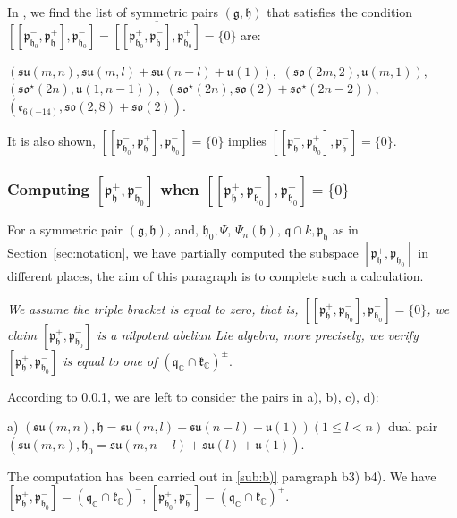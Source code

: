 \documentclass[12pt]{amsart}
\theoremstyle{definition}
\theoremstyle{remark}
\newcommand{\g}{\mathfrak{g}}
\newcommand{\h}{\mathfrak{h}}
\renewcommand{\k}{{\mathfrak k}}
\newcommand{\p}{\mathfrak p}
\newcommand{\q}{\mathfrak q}
\newcommand{\C}{{\mathbb C}}
\numberwithin{equation}{section}
\begin{document}
\subsubsection{} \label{sub:triplepairszero} In \cite[4.6]{Va},  we find the list of symmetric   pairs $(\g,\h)$ that satisfies the condition $[[ \p_{\h_0}^-,\p_\h^+ ],\p_{\h_0}^-]=\overline{[[ \p_{\h_0}^+, \p_\h^- ],
\p_{\h_0}^+]}=\{0\}$  are:
\begin{center} $ (\mathfrak{su}(m,n), \mathfrak{su} (m,l) +\mathfrak{su} ( n-l)+\mathfrak u(1)),$ $(\mathfrak{so}(2m,2), \mathfrak u(m,1)),$ \\ $(\mathfrak{so}^\star (2n), \mathfrak u(1,n-1)),$ $(\mathfrak{so}^\star(2n),  \mathfrak{so}(2) +\mathfrak{so}^\star(2n-2)),$\\
$(\mathfrak e_{6(-14)}, \mathfrak{so}(2,8)+\mathfrak{so}(2)).$
 \end{center}

It is also shown,   $[[ \p_{\h_0}^-,\p_\h^+ ],\p_{\h_0}^-]=\{0\}$ implies $[[ \p_{\h}^-,\p_{\h_0}^+ ],\p_{\h}^-]=\{0\}$.
\subsubsection{Computing $[\p_{\h}^+, \p_{\h_0}^-]$ when $[[\p_{\h}^+, \p_{\h_0}^-], \p_{\h_0}^-]=\{0\} $ }\label{sub:bracketphh0}

For a  symmetric pair $(\g,\h)$, and,  $\h_0, \Psi$, $\Psi_n(\h)$, $\q\cap k,  \p_\h   $ as in Section~\ref{sec:notation},  we  have partially computed the subspace $[\p_{\h}^+, \p_{\h_0}^-]$ in different places, the aim of this paragraph is to complete such a calculation.

{\it We assume the triple bracket is equal to zero, that is,   $[[\p_{\h}^+, \p_{\h_0}^-], \p_{\h_0}^-]=\{0\} $, we claim $[\p_{\h}^+, \p_{\h_0}^-]$ is a nilpotent abelian Lie algebra, more precisely, we verify $[\p_{\h}^+, \p_{\h_0}^-]$ is  equal to one of  $(\q_\C \cap \k_\C)^\pm$}.

According to \ref{sub:triplepairszero}, we are left to consider the  pairs in a), b), c), d):

a) $(\mathfrak{su}(m,n), \h=\mathfrak{su}(m,l)+\mathfrak{su}(n-l)+\mathfrak u(1)) (1\leq l <n)$ dual pair $ (\mathfrak{su}(m,n),\h_0=\mathfrak{su}(m,n-l)+\mathfrak{su}(l) +\mathfrak u(1))$.

The computation has been carried out in \ref{sub:b)} paragraph b3) b4). We have $[\p_{\h}^+, \p_{\h_0}^-]=(\q_\C \cap \k_\C)^-$,  $[\p_{\h_0}^+, \p_{\h}^-]=(\q_\C \cap \k_\C)^+$.
\end{document}
